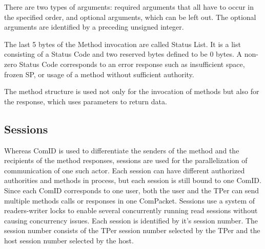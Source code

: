 There are two types of arguments: required arguments that all have to occur in the specified order, and optional arguments, which can be left out. The optional arguments are identified by a preceding unsigned integer.

The last 5 bytes of the Method invocation are called Status List. It is a list consisting of a Status Code and two reserved bytes defined to be 0 bytes. A non-zero Status Code corresponds to an error response such as insufficient space, frozen SP, or usage of a method without sufficient authority.

The method structure is used not only for the invocation of methods but also for the response, which uses parameters to return data.




\subsection{Sessions}

Whereas ComID is used to differentiate the senders of the method and the recipients of the method responses, sessions are used for the parallelization of communication of one such actor. Each session can have different authorized authorities and methods in process, but each session is still bound to one ComID. Since each ComID corresponds to one user, both the user and the TPer can send multiple methods calls or responses in one ComPacket.
Sessions use a system of readers-writer locks to enable several concurrently running read sessions without causing concurrency issues.
Each session is identified by it's session number. The session number consists of the TPer session number selected by the TPer and the host session number selected by the host.

